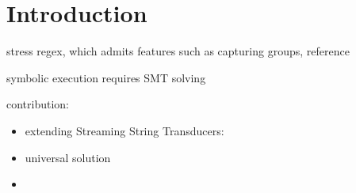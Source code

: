 
\section{Introduction}

stress regex, which admits features such as capturing groups, reference


symbolic execution requires SMT solving 

contribution: 

\begin{itemize}
	\item extending Streaming String Transducers: \cite{FR17}
	
	\item  universal solution 
	
	\item 
\end{itemize} 